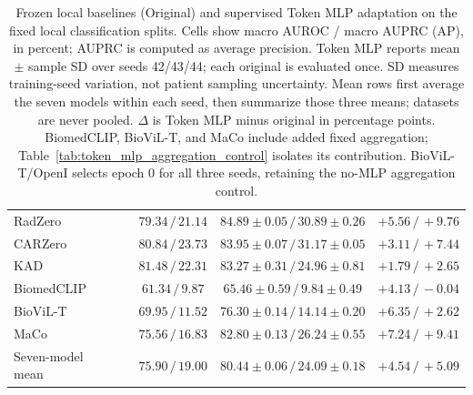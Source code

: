 \begin{table}[t]
\begin{tabular}{@{}llccc@{}}
RadZero &  & $79.34\,/\,21.14$ & $84.89\pm0.05\,/\,30.89\pm0.26$ & $+5.56\,/\,+9.76$ \\
CARZero &  & $80.84\,/\,23.73$ & $83.95\pm0.07\,/\,31.17\pm0.05$ & $+3.11\,/\,+7.44$ \\
KAD &  & $81.48\,/\,22.31$ & $83.27\pm0.31\,/\,24.96\pm0.81$ & $+1.79\,/\,+2.65$ \\
BiomedCLIP &  & $61.34\,/\,9.87$ & $65.46\pm0.59\,/\,9.84\pm0.49$ & $+4.13\,/\,-0.04$ \\
BioViL-T &  & $69.95\,/\,11.52$ & $76.30\pm0.14\,/\,14.14\pm0.20$ & $+6.35\,/\,+2.62$ \\
MaCo &  & $75.56\,/\,16.83$ & $82.80\pm0.13\,/\,26.24\pm0.55$ & $+7.24\,/\,+9.41$ \\
Seven-model mean &  & $75.90\,/\,19.00$ & $80.44\pm0.06\,/\,24.09\pm0.18$ & $+4.54\,/\,+5.09$ \\
\bottomrule
\end{tabular}
\caption{Frozen local baselines (Original) and supervised Token MLP adaptation on the fixed local classification splits. Cells show macro AUROC / macro AUPRC (AP), in percent; AUPRC is computed as average precision. Token MLP reports mean $\pm$ sample SD over seeds 42/43/44; each original is evaluated once. SD measures training-seed variation, not patient sampling uncertainty. Mean rows first average the seven models within each seed, then summarize those three means; datasets are never pooled. $\Delta$ is Token MLP minus original in percentage points. BiomedCLIP, BioViL-T, and MaCo include added fixed aggregation; Table~\ref{tab:token_mlp_aggregation_control} isolates its contribution. BioViL-T/OpenI selects epoch 0 for all three seeds, retaining the no-MLP aggregation control.}
\label{tab:token_mlp_results}
\end{table}
